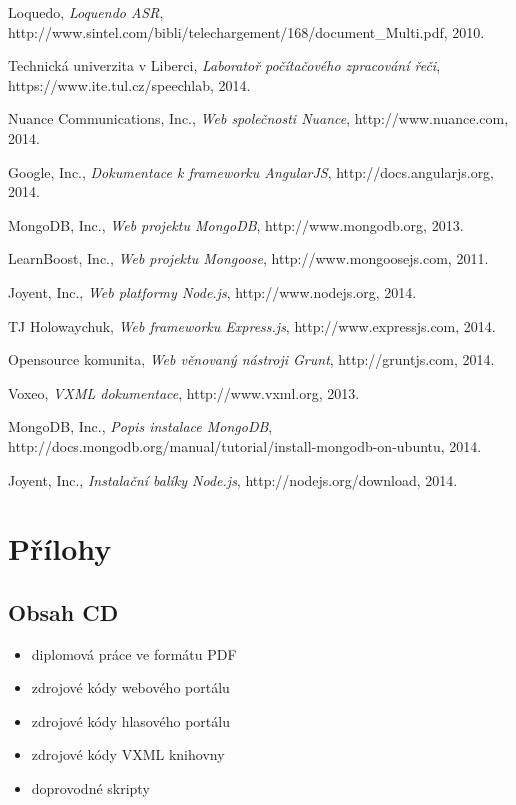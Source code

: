 \documentclass[ing,male,java,dept460,twoside]{diploma}						%
\begin{document}
\begin{thebibliography}{99}
 Loquedo,
\textit{Loquendo ASR}, http://www.sintel.com/bibli/telechargement/168/document\_Multi.pdf, 2010.

 Technická univerzita v Liberci,
\textit{Laboratoř počítačového zpracování řeči}, https://www.ite.tul.cz/speechlab, 2014.

 Nuance Communications, Inc.,
\textit{Web společnosti Nuance}, http://www.nuance.com, 2014.

 Google, Inc.,
\textit{Dokumentace k frameworku AngularJS}, http://docs.angularjs.org, 2014.

 MongoDB, Inc.,
\textit{Web projektu MongoDB}, http://www.mongodb.org, 2013.

 LearnBoost, Inc.,
\textit{Web projektu Mongoose}, http://www.mongoosejs.com, 2011.

 Joyent, Inc.,
\textit{Web platformy Node.js}, http://www.nodejs.org, 2014.

 TJ Holowaychuk,
\textit{Web frameworku Express.js}, http://www.expressjs.com, 2014.

 Opensource komunita,
\textit{Web věnovaný nástroji Grunt}, http://gruntjs.com, 2014.

 Voxeo,
\textit{VXML dokumentace}, http://www.vxml.org, 2013.

 MongoDB, Inc.,
\textit{Popis instalace MongoDB}, http://docs.mongodb.org/manual/tutorial/install-mongodb-on-ubuntu, 2014.

 Joyent, Inc.,
\textit{Instalační balíky Node.js}, http://nodejs.org/download, 2014.

\end{thebibliography}

\appendix
\section{Přílohy}
\subsection{Obsah CD}
\begin{itemize}
\item diplomová práce ve formátu PDF
\item zdrojové kódy webového portálu
\item zdrojové kódy hlasového portálu
\item zdrojové kódy VXML knihovny
\item doprovodné skripty
\end{itemize}
\end{document}
